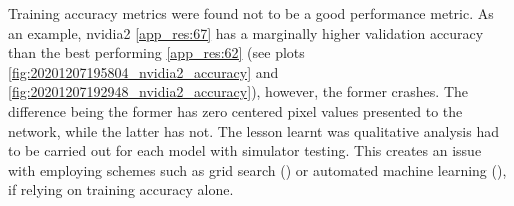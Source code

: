 


Training accuracy metrics were found not to be a good performance metric.
As an example, nvidia2 \ref{app_res:67} has a marginally higher validation accuracy than the best performing \ref{app_res:62} (see plots \ref{fig:20201207195804_nvidia2_accuracy} and \ref{fig:20201207192948_nvidia2_accuracy}), however, the former crashes. The difference being the former has zero centered pixel values presented to the network, while the latter has not. The lesson learnt was qualitative analysis had to be carried out for each model with simulator testing. This creates an issue with employing schemes such as grid search (\cite{bergstra2012random}) or automated machine learning (\cite{feurer2015efficient}), if relying on training accuracy alone.


